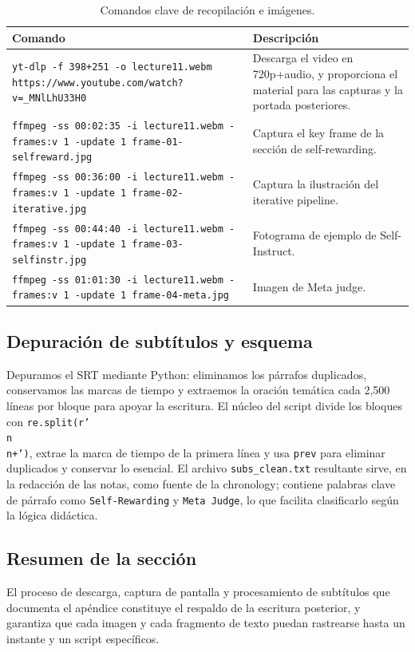 \documentclass[a4paper]{article}
\begin{document}
\begin{table}[H]
\centering
\begin{tabular}{p{6cm}p{9cm}}
\toprule
Comando & Descripción \\
\midrule
\texttt{yt-dlp -f 398+251 -o lecture11.webm https://www.youtube.com/watch?v=\_MNlLhU33H0} & Descarga el video en 720p+audio, y proporciona el material para las capturas y la portada posteriores. \\
\texttt{ffmpeg -ss 00:02:35 -i lecture11.webm -frames:v 1 -update 1 frame-01-selfreward.jpg} & Captura el key frame de la sección de self-rewarding. \\
\texttt{ffmpeg -ss 00:36:00 -i lecture11.webm -frames:v 1 -update 1 frame-02-iterative.jpg} & Captura la ilustración del iterative pipeline. \\
\texttt{ffmpeg -ss 00:44:40 -i lecture11.webm -frames:v 1 -update 1 frame-03-selfinstr.jpg} & Fotograma de ejemplo de Self-Instruct. \\
\texttt{ffmpeg -ss 01:01:30 -i lecture11.webm -frames:v 1 -update 1 frame-04-meta.jpg} & Imagen de Meta judge. \\
\bottomrule
\end{tabular}
\caption{Comandos clave de recopilación e imágenes.}
\end{table}

\subsection{Depuración de subtítulos y esquema}
Depuramos el SRT mediante Python: eliminamos los párrafos duplicados, conservamos las marcas de tiempo y extraemos la oración temática cada 2,500 líneas por bloque para apoyar la escritura. El núcleo del script divide los bloques con \texttt{re.split(r'\\n\\n+')}, extrae la marca de tiempo de la primera línea y usa \texttt{prev} para eliminar duplicados y conservar lo esencial. El archivo \texttt{subs\_clean.txt} resultante sirve, en la redacción de las notas, como fuente de la chronology; contiene palabras clave de párrafo como \texttt{Self-Rewarding} y \texttt{Meta Judge}, lo que facilita clasificarlo según la lógica didáctica.

\subsection{Resumen de la sección}
El proceso de descarga, captura de pantalla y procesamiento de subtítulos que documenta el apéndice constituye el respaldo de la escritura posterior, y garantiza que cada imagen y cada fragmento de texto puedan rastrearse hasta un instante y un script específicos.
\end{document}
